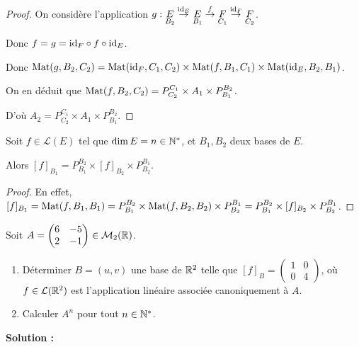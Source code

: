\documentclass[12pt, a4paper]{report}
\begin{document}
\begin{proof}
    On considère l'application $g : \underset{B_2}{E} \overset{\mathrm{id}_E}{\to} \underset{B_1}{E} \overset{f}{\to} \underset{C_1}{F} \overset{\mathrm{id}_F}{\to} \underset{C_2}{F}$.

    Donc $f = g = \mathrm{id}_F \circ f \circ \mathrm{id}_E$.

    Donc $\mathrm{Mat}(g, B_2, C_2) = \mathrm{Mat}(\mathrm{id}_F, C_1, C_2) \times \mathrm{Mat}(f, B_1, C_1) \times \mathrm{Mat}(\mathrm{id}_E, B_2, B_1)$.

    On en déduit que $\mathrm{Mat}(f, B_2, C_2) = P_{C_2}^{C_1} \times A_1 \times P_{B_1}^{B_2}$.

    D'où $A_2 = P_{C_2}^{C_1} \times A_1 \times P_{B_1}^{B_2}$.
\end{proof}

\begin{consequence}
    Soit $f \in \mathcal L(E)$ tel que $\dim E = n\in \mathbb{N}^*$, et $B_1,B_2$ deux bases de $E$.

    Alors $[f]_{B_1} = P_{B_1}^{B_2} \times [f]_{B_2} \times P_{B_2}^{B_1}$.
    \label{cons:ch_base_endo}
\end{consequence}

\begin{proof}
    En effet, $[f]_{B_1} = \mathrm{Mat}(f, B_1, B_1) = P_{B_1}^{B_2} \times \mathrm{Mat}(f, B_2, B_2) \times P_{B_2}^{B_1} = P_{B_1}^{B_2} \times [f]_{B_2} \times P_{B_2}^{B_1}$.
\end{proof}

\begin{example}
    Soit $A = \left(\begin{matrix} 6 & -5 \\ 2 & -1 \end{matrix}\right) \in \mathcal M_2(\mathbb{R})$.

    \begin{enumerate}
        \item Déterminer $B = (u,v)$ une base de $\mathbb{R}^2$ telle que $[f]_B = \left(\begin{matrix} 1 & 0 \\ 0 & 4 \end{matrix}\right)$, où $f \in \mathcal L(\mathbb{R}^2)$ est l'application linéaire associée canoniquement à $A$.
        \item Calculer $A^n$ pour tout $n \in \mathbb{N}^*$.
    \end{enumerate}

    \textbf{Solution :}


\end{example}
\end{document}
